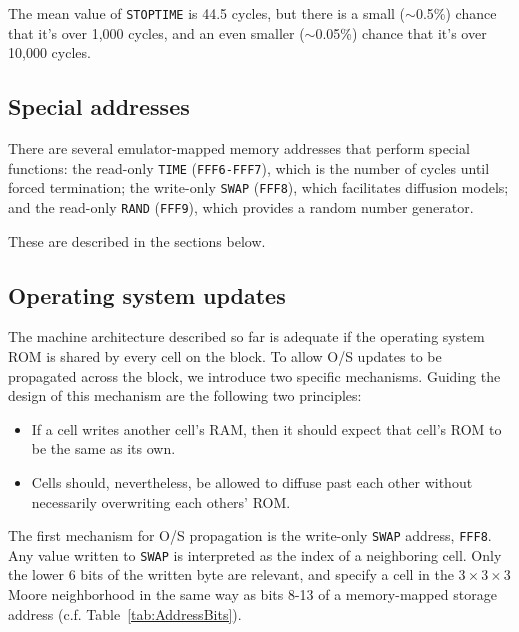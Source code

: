 \documentclass{article}
\newcommand\code[1]{{\tt #1}}
\newcommand\hex[1]{{\tt #1}}
\newcommand\hexrange[2]{\hex{#1}{\tt -}\hex{#2}}
\begin{document}

The mean value of \code{STOPTIME} is 44.5 cycles,
but there is a small ($\sim$0.5\%) chance that it's over 1,000 cycles,
and an even smaller ($\sim$0.05\%) chance that it's over 10,000 cycles.

\subsection{Special addresses}

There are several emulator-mapped memory addresses that perform special functions:
the read-only \code{TIME} (\hexrange{FFF6}{FFF7}), which is the number of cycles until forced termination;
the write-only \code{SWAP} (\hex{FFF8}), which facilitates diffusion models;
and the read-only \code{RAND} (\hex{FFF9}), which provides a random number generator.

These are described in the sections below.

\subsection{Operating system updates}

The machine architecture described so far is adequate if the operating system ROM is shared by every cell on the block.
To allow O/S updates to be propagated across the block, we introduce two specific mechanisms.
Guiding the design of this mechanism are the following two principles:
\begin{itemize}
\item If a cell writes another cell's RAM, then it should expect that cell's ROM to be the same as its own.
\item Cells should, nevertheless, be allowed to diffuse past each other without necessarily overwriting each others' ROM.
\end{itemize}

The first mechanism for O/S propagation is the write-only \code{SWAP} address, \hex{FFF8}.
Any value written to \code{SWAP} is interpreted as the index of a neighboring cell.
Only the lower 6 bits of the written byte are relevant, and specify a cell in the $3 \times 3 \times 3$ Moore neighborhood
in the same way as bits 8-13 of a memory-mapped storage address (c.f. Table~\ref{tab:AddressBits}).
\end{document}

